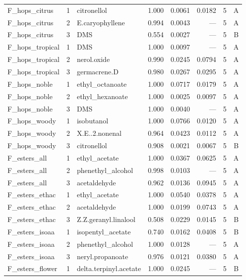 \begin{longtable}{@{}p{} r p{} r r r r c@{}}
F\_hops\_citrus & 1 & citronellol & 1.000 & 0.0061 & 0.0182 & 5 & A \\
F\_hops\_citrus & 2 & E.\allowbreak{}caryophyllene & 0.994 & 0.0043 & --- & 5 & A \\
F\_hops\_citrus & 3 & DMS & 0.554 & 0.0027 & --- & 5 & B \\
F\_hops\_tropical & 1 & DMS & 1.000 & 0.0097 & --- & 5 & A \\
F\_hops\_tropical & 2 & nerol.\allowbreak{}oxide & 0.990 & 0.0245 & 0.0794 & 5 & A \\
F\_hops\_tropical & 3 & germacrene.\allowbreak{}D & 0.980 & 0.0267 & 0.0295 & 5 & A \\
F\_hops\_noble & 1 & ethyl\_octanoate & 1.000 & 0.0717 & 0.0179 & 5 & A \\
F\_hops\_noble & 2 & ethyl\_hexanoate & 1.000 & 0.0025 & 0.0097 & 5 & A \\
F\_hops\_noble & 3 & DMS & 1.000 & 0.0040 & --- & 5 & A \\
F\_hops\_woody & 1 & isobutanol & 1.000 & 0.0766 & 0.0120 & 5 & A \\
F\_hops\_woody & 2 & X.\allowbreak{}E.\allowbreak{}.\allowbreak{}2.\allowbreak{}nonenal & 0.964 & 0.0423 & 0.0112 & 5 & A \\
F\_hops\_woody & 3 & citronellol & 0.908 & 0.0021 & 0.0067 & 5 & B \\
F\_esters\_all & 1 & ethyl\_acetate & 1.000 & 0.0367 & 0.0625 & 5 & A \\
F\_esters\_all & 2 & phenethyl\_alcohol & 0.998 & 0.0103 & --- & 5 & A \\
F\_esters\_all & 3 & acetaldehyde & 0.962 & 0.0136 & 0.0945 & 5 & A \\
F\_esters\_ethac & 1 & ethyl\_acetate & 1.000 & 0.0540 & 0.0378 & 5 & A \\
F\_esters\_ethac & 2 & acetaldehyde & 1.000 & 0.0199 & 0.0743 & 5 & A \\
F\_esters\_ethac & 3 & Z.\allowbreak{}Z.\allowbreak{}geranyl.\allowbreak{}linalool & 0.508 & 0.0229 & 0.0145 & 5 & B \\
F\_esters\_isoaa & 1 & isopentyl\_acetate & 0.740 & 0.0162 & 0.0408 & 5 & B \\
F\_esters\_isoaa & 2 & phenethyl\_alcohol & 1.000 & 0.0128 & --- & 5 & A \\
F\_esters\_isoaa & 3 & neryl.\allowbreak{}propanoate & 0.976 & 0.0121 & 0.0380 & 5 & A \\
F\_esters\_flower & 1 & delta.\allowbreak{}terpinyl.\allowbreak{}acetate & 1.000 & 0.0245 & --- & 5 & B \\

\end{longtable}
